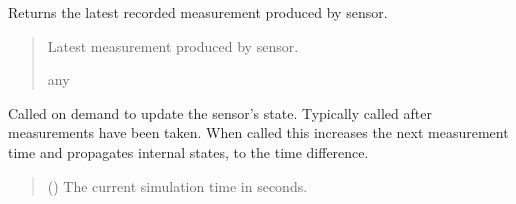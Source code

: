 \documentclass[letterpaper,10pt,english]{sphinxmanual}
\begin{document}
\begin{fulllineitems}
\begin{fulllineitems}
\begin{quote}
\begin{description}
\begin{itemize}
\end{itemize}

\end{description}\end{quote}

\end{fulllineitems}


\begin{fulllineitems}
\label{\detokenize{modules/measurement/sensor:qnav.measurement.sensor.Sensor.last_measurement}}
\pysigstartsignatures
{}
\pysigstopsignatures
\sphinxAtStartPar
Returns the latest recorded measurement produced by sensor.
\begin{quote}\begin{description}
\sphinxAtStartPar
Latest measurement produced by sensor.

\sphinxAtStartPar
any

\end{description}\end{quote}

\end{fulllineitems}


\begin{fulllineitems}
\label{\detokenize{modules/measurement/sensor:qnav.measurement.sensor.Sensor.update}}
\pysigstartsignatures
{}
\pysigstopsignatures
\sphinxAtStartPar
Called on demand to update the sensor’s state.
Typically called after measurements have been taken. When called
this increases the next measurement time and propagates internal
states, to the time difference.
\begin{quote}\begin{description}
\sphinxAtStartPar
{} () \textendash{} The current simulation time in seconds.


\end{description}
\end{quote}
\end{fulllineitems}
\end{fulllineitems}
\end{document}
